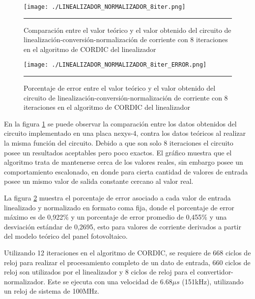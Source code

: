 \begin{figure}[H]
  \centering
    \texttt{[image: ./LINEALIZADOR\_NORMALIZADOR\_8iter.png]}
    \rule{35em}{0.5pt}
  \caption[Comparación entre el valor teórico y el valor obtenido del circuito de linealización-conversión-normalización de corriente con 8 iteraciones en el algoritmo de CORDIC del linealizador]{Comparación entre el valor teórico y el valor obtenido del circuito de linealización-conversión-normalización de corriente con 8 iteraciones en el algoritmo de CORDIC del linealizador}
  \label{fig:LIN_NOR_8}
\end{figure}

\newpage 

\begin{figure}[H]
  \centering
    \texttt{[image: ./LINEALIZADOR\_NORMALIZADOR\_8iter\_ERROR.png]}
    \rule{35em}{0.5pt}
  \caption[Porcentaje de error entre el valor teórico y el valor obtenido del circuito de linealización-conversión-normalización de corriente con 8 iteraciones en el algoritmo de CORDIC del linealizador]{Porcentaje de error entre el valor teórico y el valor obtenido del circuito de linealización-conversión-normalización de corriente con 8 iteraciones en el algoritmo de CORDIC del linealizador}
  \label{fig:LIN_NOR_8_E}
\end{figure}

En la figura \ref{fig:LIN_NOR_8} se puede observar la comparación entre los datos obtenidos del circuito implementado en una placa nexys-4, contra los datos teóricos al realizar la misma función del circuito. Debido a que son solo 8 iteraciones el circuito posee un resultados aceptables pero poco exactos. El gráfico muestra que el algoritmo trata de mantenerse cerca de los valores reales, sin embargo posee un comportamiento escalonado, en donde para cierta cantidad de valores de entrada posee un mismo valor de salida constante cercano al valor real. 

La figura \ref{fig:LIN_NOR_8_E} muestra el porcentaje de error asociado a cada valor de entrada linealizado y normalizado en formato coma fija, donde el porcentaje de error máximo es de 0,922\% y un porcentaje de error promedio de 0,455\% y una desviación estándar de 0,2695, esto para valores de corriente derivados a partir del modelo teórico del panel fotovoltaico. 
  

Utilizando 12 iteraciones en el algoritmo de CORDIC, se requiere de 668 ciclos de reloj para realizar el procesamiento completo de un dato de entrada, 660 ciclos de reloj son utilizados por el linealizador y 8 ciclos de reloj para el convertidor-normalizador. Este se ejecuta con una velocidad de 6.68$ \mu s$ (151kHz), utilizando un reloj de sistema de 100MHz.   

